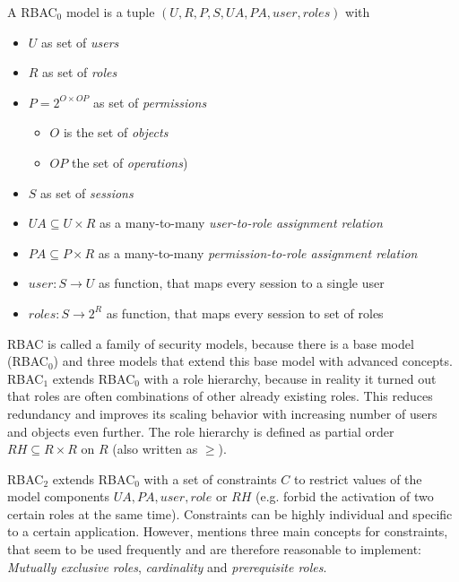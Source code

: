\documentclass[twoside, openright, 12pt]{book}
\begin{document}
\begin{xdefinition}[RBAC] 
A RBAC$_0$ model is a tuple $(U, R, P, S, UA, PA, user, roles)$ with

\vspace{-2mm}
\begin{itemize}
\setlength\itemsep{0em}
\item $U$ as set of \textit{users}
\item $R$ as set of \textit{roles}
\item $P = 2^{O \times OP}$ as set of \textit{permissions}
\vspace{-2mm}
\begin{itemize}
\item $O$ is the set of \textit{objects}
\item $OP$ the set of \textit{operations})
\end{itemize}
\vspace{-2mm}
\item $S$ as set of \textit{sessions}
\item $UA \subseteq U \times R$ as a many-to-many \textit{user-to-role assignment relation}
\item $PA \subseteq P \times R$ as a many-to-many \textit{permission-to-role assignment relation}
\item $user: S \rightarrow U$ as function, that maps every session to a single user
\item $roles: S \rightarrow 2^R$ as function, that maps every session to set of roles
\end{itemize}
\label{definition:RBAC}
\end{xdefinition}

\noindent
RBAC is called a family of security models, because there is a base model (RBAC$_0$) and three models that extend this base model with advanced concepts.
RBAC$_1$ extends RBAC$_0$ with a role hierarchy, because in reality it turned out that roles are often combinations of other already existing roles.
This reduces redundancy and improves its scaling behavior with increasing number of users and objects even further.
The role hierarchy is defined as partial order $RH \subseteq R \times R$ on $R$ (also written as $\geq$).

RBAC$_2$ extends RBAC$_0$ with a set of constraints $C$ to restrict values of the model components $UA, PA, user, role$ or $RH$ (e.g. forbid the activation of two certain roles at the same time).
Constraints can be highly individual and specific to a certain application.
However, \cite{Sandhu96} mentions three main concepts for constraints, that seem to be used frequently and are therefore reasonable to implement: \textit{Mutually exclusive roles}, \textit{cardinality} and \textit{prerequisite roles}.
\end{document}
